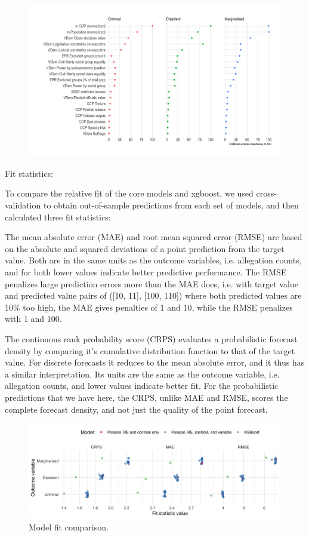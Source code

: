 \documentclass[12pt]{article}
\begin{document}
\begin{figure}
\includegraphics[width=.9\textwidth]{../output/figures/xgboost-variable-importance-v2.png}
\end{figure}

Fit statistics:

To compare the relative fit of the core models and xgboost, we used cross-validation to obtain out-of-sample predictions from each set of models, and then calculated three fit statistics:

The mean absolute error (MAE) and root mean squared error (RMSE) are based on the absolute and squared deviations of a point prediction from the target value. Both are in the same units as the outcome variables, i.e. allegation counts, and for both lower values indicate better predictive performance. The RMSE penalizes large prediction errors more than the MAE does, i.e. with target value and predicted value pairs of ([10, 11], [100, 110]) where both predicted values are 10\% too high, the MAE gives penalties of 1 and 10, while the RMSE penalizes with 1 and 100. 

The continuous rank probability score (CRPS) evaluates a probabilistic forecast density by comparing it's cumulative distribution function to that of the target value. For discrete forecasts it reduces to the mean absolute error, and it thus has a similar interpretation. Its units are the same as the outcome variable, i.e. allegation counts, and lower values indicate better fit. For the probabilistic predictions that we have here, the CRPS, unlike MAE and RMSE, scores the complete forecast density, and not just the quality of the point forecast. 

\begin{figure}
\caption{Model fit comparison.}
\includegraphics[width=.9\textwidth]{../output/figures/oos-fit-all.png}
\end{figure}
\end{document}
